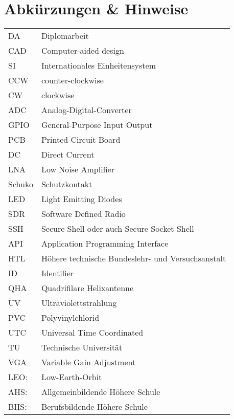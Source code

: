 \section*{Abkürzungen \& Hinweise}
\begin{singlespace}
	\begin{tabular}{ll}
		DA     & Diplomarbeit \\
		CAD    & Computer-aided design \\
		SI     & Internationales Einheitensystem \\
		CCW	   & counter-clockwise \\
		CW     & clockwise \\
		ADC	   & Analog-Digital-Converter \\
		GPIO   & General-Purpose Input Output \\
		PCB	   & Printed Circuit Board \\
		DC     & Direct Current \\
		LNA    & Low Noise Amplifier \\
		Schuko & Schutzkontakt \\
		LED	   & Light Emitting Diodes \\
		SDR    & Software Defined Radio \\
		SSH    & Secure Shell oder auch Secure Socket Shell \\
		API    & Application Programming Interface \\
		HTL    & Höhere technische Bundeslehr- und Versuchsanstalt \\
		ID     & Identifier \\
		QHA    & Quadrifilare Helixantenne \\
		UV     & Ultraviolettstrahlung \\
		PVC    & Polyvinylchlorid \\
		UTC    & Universal Time Coordinated \\
		TU     & Technische Universität \\
		VGA    & Variable Gain Adjustment \\
		LEO:   & Low-Earth-Orbit \\
		AHS:   & Allgemeinbildende Höhere Schule \\
		BHS:   & Berufsbildende Höhere Schule \\
	\end{tabular}
\end{singlespace}

\pagebreak
